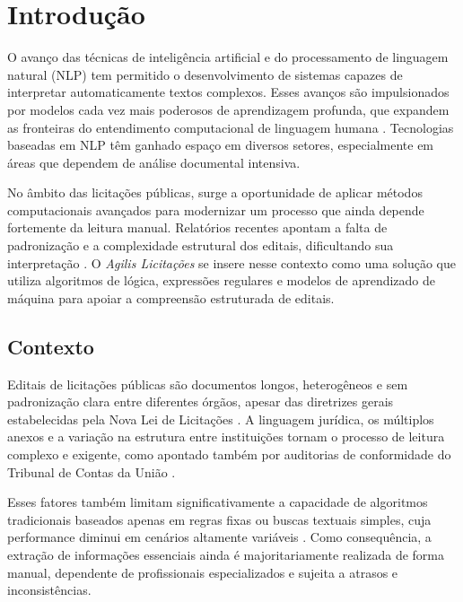 \chapter{Introdução}

O avanço das técnicas de inteligência artificial e do processamento de linguagem natural (NLP) tem permitido o desenvolvimento de sistemas capazes de interpretar automaticamente textos complexos. Esses avanços são impulsionados por modelos cada vez mais poderosos de aprendizagem profunda, que expandem as fronteiras do entendimento computacional de linguagem humana \cite{russell_norvig_2020, jurafsky_martin_2023, goodfellow_deep_learning_2016}. Tecnologias baseadas em NLP têm ganhado espaço em diversos setores, especialmente em áreas que dependem de análise documental intensiva.

No âmbito das licitações públicas, surge a oportunidade de aplicar métodos computacionais avançados para modernizar um processo que ainda depende fortemente da leitura manual. Relatórios recentes apontam a falta de padronização e a complexidade estrutural dos editais, dificultando sua interpretação \cite{tcu_relatorio_2022, brasil_lei_14133_2021}. O \textit{Agilis Licitações} se insere nesse contexto como uma solução que utiliza algoritmos de lógica, expressões regulares e modelos de aprendizado de máquina para apoiar a compreensão estruturada de editais.


\section{Contexto}

Editais de licitações públicas são documentos longos, heterogêneos e sem padronização clara entre diferentes órgãos, apesar das diretrizes gerais estabelecidas pela Nova Lei de Licitações \cite{brasil_lei_14133_2021}. A linguagem jurídica, os múltiplos anexos e a variação na estrutura entre instituições tornam o processo de leitura complexo e exigente, como apontado também por auditorias de conformidade do Tribunal de Contas da União \cite{tcu_relatorio_2022}.

Esses fatores também limitam significativamente a capacidade de algoritmos tradicionais baseados apenas em regras fixas ou buscas textuais simples, cuja performance diminui em cenários altamente variáveis \cite{kim_rule_based_limitations_2019}. Como consequência, a extração de informações essenciais ainda é majoritariamente realizada de forma manual, dependente de profissionais especializados e sujeita a atrasos e inconsistências.

